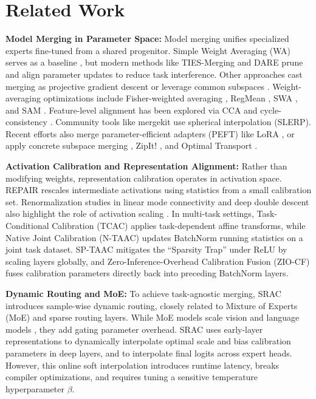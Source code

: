 \documentclass{article}
\theoremstyle{plain}
\theoremstyle{definition}
\theoremstyle{remark}
\begin{document}
\section{Related Work}
\label{submission-related-work}
\textbf{Model Merging in Parameter Space:} Model merging unifies specialized experts fine-tuned from a shared progenitor. Simple Weight Averaging (WA) serves as a baseline \cite{Wortsman2022b}, but modern methods like TIES-Merging \cite{Yadav2023} and DARE \cite{Yu2024} prune and align parameter updates to reduce task interference. Other approaches cast merging as projective gradient descent \cite{Wei2025} or leverage common subspaces \cite{Marczak2025}. Weight-averaging optimizations include Fisher-weighted averaging \cite{Matena2022}, RegMean \cite{Jin2023}, SWA \cite{Izmailov2018}, and SAM \cite{Foret2021}. Feature-level alignment has been explored via CCA \cite{Horoi2024} and cycle-consistency \cite{Crisostomi2024}. Community tools like mergekit \cite{Goddard2024} use spherical interpolation (SLERP). Recent efforts also merge parameter-efficient adapters (PEFT) like LoRA \cite{Hu2022, Zhang2023, Yang2024}, or apply concrete subspace merging \cite{Choshen2024}, ZipIt! \cite{Stoica2024}, and Optimal Transport \cite{Singh2020}.

\textbf{Activation Calibration and Representation Alignment:} Rather than modifying weights, representation calibration operates in activation space. REPAIR \cite{Jordan2022} rescales intermediate activations using statistics from a small calibration set. Renormalization studies in linear mode connectivity \cite{Frankle2020} and deep double descent \cite{Nakkiran2020} also highlight the role of activation scaling \cite{Entezari2023, Caccia2023}. In multi-task settings, Task-Conditional Calibration (TCAC) \cite{Authors2026a} applies task-dependent affine transforms, while Native Joint Calibration (N-TAAC) \cite{Authors2026b} updates BatchNorm running statistics on a joint task dataset. SP-TAAC \cite{Authors2026c} mitigates the ``Sparsity Trap'' under ReLU by scaling layers globally, and Zero-Inference-Overhead Calibration Fusion (ZIO-CF) \cite{Authors2026c} fuses calibration parameters directly back into preceding BatchNorm layers.

\textbf{Dynamic Routing and MoE:} To achieve task-agnostic merging, SRAC \cite{Authors2026a} introduces sample-wise dynamic routing, closely related to Mixture of Experts (MoE) \cite{Shazeer2017} and sparse routing layers. While MoE models scale vision \cite{Riquelme2021} and language models \cite{Fedus2022, Du2022}, they add gating parameter overhead. SRAC uses early-layer representations to dynamically interpolate optimal scale and bias calibration parameters in deep layers, and to interpolate final logits across expert heads. However, this online soft interpolation introduces runtime latency, breaks compiler optimizations, and requires tuning a sensitive temperature hyperparameter $\beta$.
\end{document}

